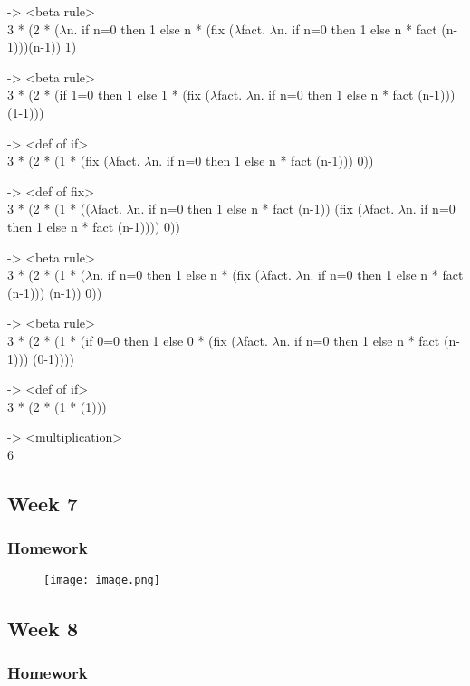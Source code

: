 \documentclass{article}
\theoremstyle{theorem}
\theoremstyle{definition}
\theoremstyle{remark}
\begin{document}
-> <beta rule>\\
3 * (2 * ($\lambda$n. if n=0 then 1 else n * (fix ($\lambda$fact. $\lambda$n. if n=0 then 1 else n * fact (n-1)))(n-1)) 1)

-> <beta rule>\\
3 * (2 * (if 1=0 then 1 else 1 * (fix ($\lambda$fact. $\lambda$n. if n=0 then 1 else n * fact (n-1)))(1-1)))

-> <def of if>\\
3 * (2 * (1 * (fix ($\lambda$fact. $\lambda$n. if n=0 then 1 else n * fact (n-1))) 0))

-> <def of fix>\\
3 * (2 * (1 * (($\lambda$fact. $\lambda$n. if n=0 then 1 else n * fact (n-1)) (fix ($\lambda$fact. $\lambda$n. if n=0 then 1 else n * fact (n-1)))) 0))

-> <beta rule>\\
3 * (2 * (1 * ($\lambda$n. if n=0 then 1 else n * (fix ($\lambda$fact. $\lambda$n. if n=0 then 1 else n * fact (n-1))) (n-1)) 0))

-> <beta rule>\\
3 * (2 * (1 * (if 0=0 then 1 else 0 * (fix ($\lambda$fact. $\lambda$n. if n=0 then 1 else n * fact (n-1))) (0-1))))

-> <def of if>\\
3 * (2 * (1 * (1)))

-> <multiplication>\\
6

\subsection{Week 7}

\subsubsection{Homework}

\begin{figure}[H]
    \centering
    \texttt{[image: image.png]}
\end{figure}

\subsection{Week 8}

\subsubsection{Homework}
\end{document}
